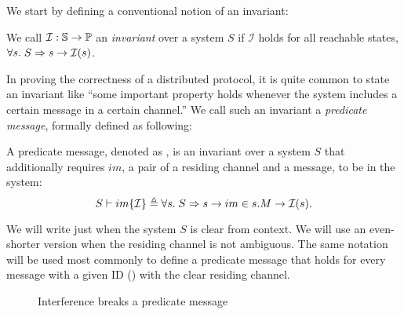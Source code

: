 We start by defining a conventional notion of an invariant:
\begin{definition}[Invariants]
  We call $\mathcal{I}: \mathbb{S}{} \to \mathbb{P}{}$ an \emph{invariant} over a system $S$ if $\mathcal{I}$ holds for all reachable states, \ie{} $\forall s.\; S \Rightarrow s \to \mathcal{I}(s)$.
\end{definition}

In proving the correctness of a distributed protocol, it is quite common to state an invariant like ``some important property holds whenever the system includes a certain message in a certain channel.''
We call such an invariant a \emph{predicate message}, formally defined as following:
\begin{definition}
  A predicate message, denoted as , is an invariant over a system $S$ that additionally requires $im$, a pair of a residing channel and a message, to be in the system:
  \begin{displaymath}
    S \vdash im\{\mathcal{I}\} \triangleq \forall s.\; S \Rightarrow s \to im \in s.M \to \mathcal{I}(s).
  \end{displaymath}
  \label{def-pred-msg}
\end{definition}

We will write just  when the system $S$ is clear from context.
We will use an even-shorter version  when the residing channel is not ambiguous.
The same notation  will be used most commonly to define a predicate message that holds for every message with a given ID (\msgid{}) with the clear residing channel.

\begin{figure}[h]
  \centering
  \caption{Interference breaks a predicate message}
  \label{fig-ex-pred-msg-fail}
\end{figure}

